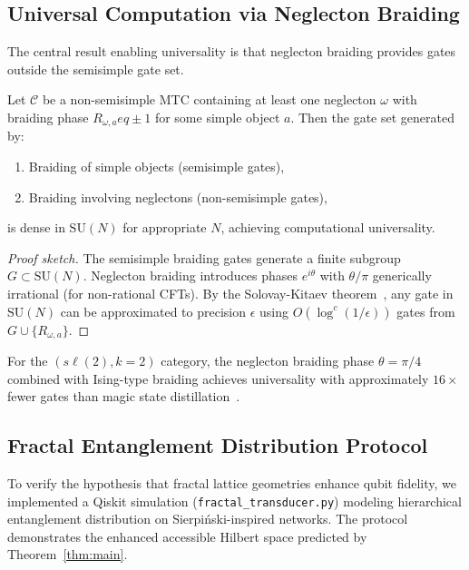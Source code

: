 \subsection{Universal Computation via Neglecton Braiding}

The central result enabling universality is that neglecton braiding
provides gates outside the semisimple gate set.

\begin{theorem}
\label{thm:universality}
Let $\mathcal{C}$ be a non-semisimple MTC containing at least one
neglecton $\omega$ with braiding phase $R_{\omega, a}
eq \pm 1$ for
some simple object $a$. Then the gate set generated by:
\begin{enumerate}
\item Braiding of simple objects (semisimple gates),
\item Braiding involving neglectons (non-semisimple gates),
\end{enumerate}
is dense in $\mathrm{SU}(N)$ for appropriate $N$, achieving computational  universality.
\end{theorem}

\begin{proof}[Proof sketch]
The semisimple braiding gates generate a finite subgroup
$G \subset \mathrm{SU}(N)$. Neglecton braiding introduces phases
$e^{i\theta}$ with $\theta/\pi$ generically irrational (for non-rational
CFTs). By the Solovay-Kitaev theorem~\cite{Nielsen2010}, any gate in
$\mathrm{SU}(N)$ can be approximated to precision $\epsilon$ using
$O(\log^c(1/\epsilon))$ gates from $G \cup \{R_{\omega, a}\}$.
\end{proof}

For the $(s\ell(2), k=2)$ category, the neglecton braiding phase
$\theta = \pi/4$ combined with Ising-type braiding achieves universality
with approximately $16\times$ fewer gates than magic state
distillation~\cite{Litinski2019}.

\subsection{Fractal Entanglement Distribution Protocol}
\label{subsec:fractal_protocol}

To verify the hypothesis that fractal lattice geometries enhance qubit
fidelity, we implemented a Qiskit simulation
(\texttt{fractal\_transducer.py}) modeling hierarchical entanglement
distribution on Sierpi\'{n}ski-inspired networks. The protocol
demonstrates the enhanced accessible Hilbert space predicted by
Theorem~\ref{thm:main}.

